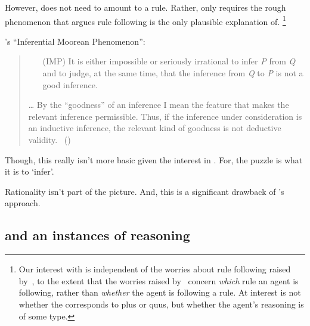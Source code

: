 \begin{note}
  However, \tor{} does not need to amount to a rule.
  Rather, \tR{} only requires the rough phenomenon that \citeauthor{Boghossian:2008vf} argues rule following is the only plausible explanation of.%
  \footnote{
    Our interest with  is independent of the worries about rule following raised by~\textcite{Kripke:1982aa}, to the extent that the worries raised by~\citeauthor{Kripke:1982aa} concern \emph{which} rule an agent is following, rather than \emph{whether} the agent is following a rule.
    At interest is not whether the \tor{} corresponds to plus or quus, but whether the agent's reasoning is of some type.
  }
\end{note}

\begin{note}
  \citeauthor{Hlobil:2014tq}'s ``Inferential Moorean Phenomenon'':
  \begin{quote}
    \begin{enumerate}
    \item[(IMP)]
      It is either impossible or seriously irrational to infer \emph{P} from \emph{Q} and to judge, at the same time, that the inference from \emph{Q} to \emph{P} is not a good inference.
    \end{enumerate}
    \dots
    By the ``goodness'' of an inference I mean the feature that makes the relevant inference permissible. Thus, if the inference under consideration is an inductive inference, the relevant kind of goodness is not deductive validity.%
    \mbox{ }\hfill\mbox{(\citeyear[\S1]{Hlobil:2014tq})}
  \end{quote}

  Though, this really isn't more basic given the interest in \tR{}.
  For, the puzzle is what it is to `infer'.

  Rationality isn't part of the picture.
  And, this is a significant drawback of \citeauthor{Hlobil:2014tq}'s approach.
\end{note}

\subsection{ and an instances of reasoning}
\label{cha:typical:sec:tor:g-s}


